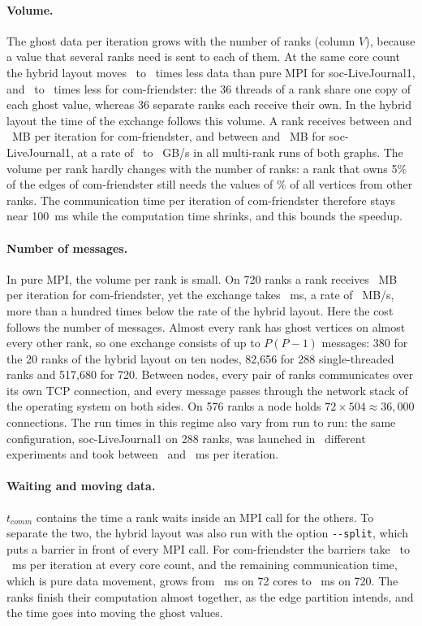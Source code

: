 \documentclass[11pt,a4paper]{article}
\newcommand{\code}[1]{\texttt{#1}}
\begin{document}
\paragraph{Volume.} The ghost data per iteration grows with the number of ranks (column $V$), because a value that
several ranks need is sent to each of them. At the same core count the hybrid layout moves \cmLJvolMin\ to
\cmLJvolMax\ times less data than pure MPI for soc-LiveJournal1, and \cmFRvolMin\ to \cmFRvolMax\ times less for
com-friendster: the 36 threads of a rank share one copy of each ghost value, whereas 36 separate ranks each receive
their own. In the hybrid layout the time of the exchange follows this volume. A rank receives between
 and ~MB per iteration for com-friendster, and between  and
~MB for soc-LiveJournal1, at a rate of \cmALLrateMin\ to \cmALLrateMax~GB/s in all multi-rank runs
of both graphs. The volume per rank hardly changes with the number of ranks: a rank that owns 5\% of the edges of
com-friendster still needs the values of \cmFRghostFrac\% of all vertices from other ranks. The communication time per iteration of
com-friendster therefore stays near 100~ms while the computation time shrinks, and this bounds the speedup.

\paragraph{Number of messages.} In pure MPI, the volume per rank is small. On 720 ranks a rank receives
\cmFRmpPer~MB per iteration for com-friendster, yet the exchange takes ~ms, a rate of
\cmFRmpRate~MB/s, more than a hundred times below the rate of the hybrid layout. Here the cost follows the number of messages.
Almost every rank has ghost vertices on almost every other rank, so one exchange consists of up to $P(P-1)$
messages: 380 for the 20 ranks of the hybrid layout on ten nodes, 82,656 for 288 single-threaded ranks and 517,680
for 720. Between nodes, every pair of ranks communicates over its own TCP connection, and every message passes
through the network stack of the operating system on both sides. On 576 ranks a node holds $72\times504\approx36{,}000$
connections. The run times in this regime also vary from run to run: the same configuration, soc-LiveJournal1 on
288 ranks, was launched in \mpLJvarN\ different experiments and took between \mpLJvarMin\ and \mpLJvarMax~ms per
iteration.

\paragraph{Waiting and moving data.} $t_{comm}$ contains the time a rank waits inside an MPI call for the others.
To separate the two, the hybrid layout was also run with the option \code{-{}-split}, which puts a barrier in front of
every MPI call. For com-friendster the barriers take \spFRwaitMin\ to \spFRwaitMax~ms per iteration at every core
count, and the remaining communication time, which is pure data movement, grows from ~ms on 72 cores to
~ms on 720. The ranks finish their computation almost together, as the edge partition intends, and
the time goes into moving the ghost values.
\end{document}
